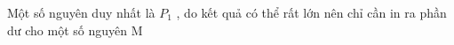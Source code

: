 Một số nguyên duy nhất là $P_{1}$   , do kết quả có thể rất lớn nên chỉ cần in ra phần dư cho một số nguyên M